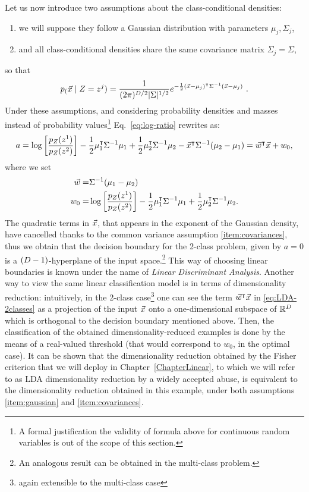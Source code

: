 Let us now introduce two assumptions about the class-conditional densities:
\begin{enumerate}[label=(\roman*)]
\item \label{item:gaussian} we will suppose they follow a Gaussian distribution with parameters $\mu_j, \Sigma_j$,
\item \label{item:covariances} and all class-conditional densities share the same covariance matrix $\Sigma_j=\Sigma$,
\end{enumerate}
so that
\begin{equation}
\pdf_(\given{\vLeakVec}{\sensRandVar = \sensVar^j}) = \frac{1}{(2\pi)^{{\traceLength}/2}\lvert \Sigma\rvert^{1/2}}e^{-\frac{1}{2}(\vLeakVec- \mu_j)^\intercal\Sigma^{-1}(\vLeakVec- \mu_j)} \mbox{ .}
\end{equation}
Under these assumptions, and considering probability densities and masses instead of probability values\footnote{A formal justification the validity of formula above for continuous random variables is out of the scope of this section.} Eq.~\eqref{eq:log-ratio} rewrites as: 
\begin{equation}\label{eq:LDA-2classes}
a = \log\left[\frac{p_{Z}(z^1)}{p_{Z}(z^2)}\right] - \frac{1}{2}\mu_1^\intercal\Sigma^{-1}\mu_1 + \frac{1}{2}\mu_2^\intercal\Sigma^{-1}\mu_2 - \vec{x}^\intercal\Sigma^{-1}(\mu_2-\mu_1) = \vec{w}^\intercal \vec{x} + w_0, 
\end{equation}
where we set 
\begin{align*}
\vec{w} =& \Sigma^{-1}(\mu_1-\mu_2)\\
w_0 =  & \log\left[\frac{p_{Z}(z^1)}{p_{Z}(z^2)}\right] - \frac{1}{2}\mu_1^\intercal\Sigma^{-1}\mu_1 + \frac{1}{2}\mu_2^\intercal\Sigma^{-1}\mu_2 . 
\end{align*}
The quadratic terms in $\vec{x}$, that appears in the exponent of the Gaussian density, have cancelled thanks to the common variance assumption \ref{item:covariances}, thus we obtain that the decision boundary for the 2-class problem, given by $a=0$ is a $(D - 1)$-hyperplane of the input space.\footnote{An analogous result can be obtained in the multi-class problem.} This way of choosing linear boundaries is known under the name of \emph{Linear Discriminant Analysis}. Another way to view the same linear classification model is in terms of dimensionality reduction: intuitively, in the 2-class case\footnote{again extensible to the multi-class case} one can see the term $\vec{w}^\intercal \vec{x}$ in \eqref{eq:LDA-2classes} as a projection of the input $\vec{x}$ onto a one-dimensional subspace of $\mathbb{R}^D$ which is orthogonal to the decision boundary mentioned above. Then, the classification of the obtained dimensionality-reduced examples is done by the means of a real-valued threshold (that would correspond to $w_0$, in the optimal case). It can be shown that the dimensionality reduction obtained by the Fisher criterion that we will deploy in Chapter~\ref{ChapterLinear}, to which we will refer to as LDA dimensionality reduction by a widely accepted abuse, is equivalent to the dimensionality reduction obtained in this example, under both assumptions \ref{item:gaussian} and \ref{item:covariances}.  \\
